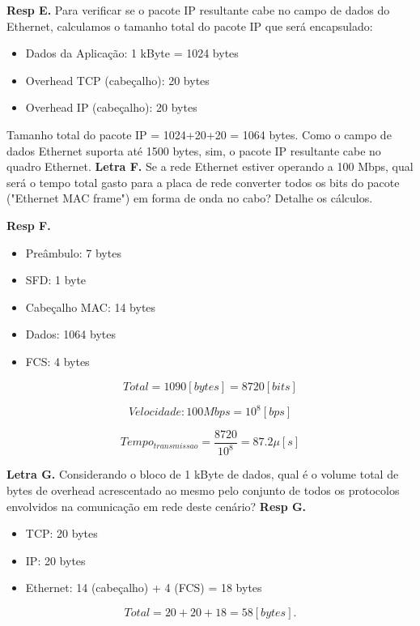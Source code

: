 \textbf{Resp E.} Para verificar se o pacote IP resultante cabe no campo de dados do Ethernet, calculamos o tamanho total do pacote IP que será encapsulado:

\begin{itemize}
    \item Dados da Aplicação: 1 kByte = 1024 bytes
    \item Overhead TCP (cabeçalho): 20 bytes
    \item Overhead IP (cabeçalho): 20 bytes
\end{itemize}

Tamanho total do pacote IP = 1024+20+20 = 1064 bytes. Como o campo de dados Ethernet suporta até 1500 bytes, sim, o pacote IP resultante cabe no quadro Ethernet.
\newline
\textbf{Letra F.} Se a rede Ethernet estiver operando a 100 Mbps, qual será o tempo total gasto para a placa de rede converter todos os bits do pacote ("Ethernet MAC frame") em forma de onda no cabo? Detalhe os cálculos.
\newline

\textbf{Resp F.}
\begin{itemize}
    \item Preâmbulo: 7 bytes
    \item SFD: 1 byte
    \item Cabeçalho MAC: 14 bytes
    \item Dados: 1064 bytes
    \item FCS: 4 bytes
\end{itemize}

\begin{equation}
Total = 1090 [bytes] = 8720 [bits]
\end{equation}

\begin{equation}
Velocidade: 100 Mbps = 10^8 [bps]
\end{equation}

\begin{equation}
Tempo_{transmissao} = \frac{8720}{10^8} = 87.2 \mu [s]
\end{equation}
\newline


\textbf{Letra G.} Considerando o bloco de 1 kByte de dados, qual é o volume total de bytes de overhead acrescentado ao mesmo pelo conjunto de todos os protocolos envolvidos na comunicação em rede deste cenário?
\newline
\textbf{Resp G.}
\begin{itemize}
    \item TCP: 20 bytes
    \item IP: 20 bytes
    \item Ethernet: 14 (cabeçalho) + 4 (FCS) = 18 bytes
\end{itemize}

\begin{equation}
    Total = 20 + 20 + 18 = 58 [bytes].
\end{equation}
